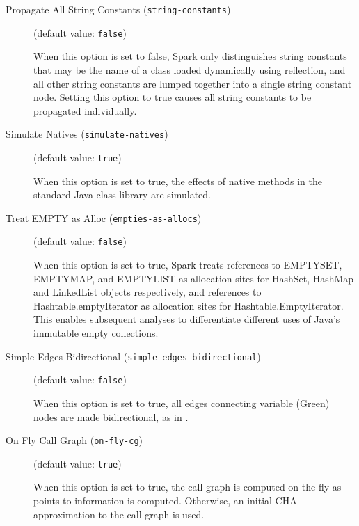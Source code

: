 \documentclass{article}
\begin{document}
\begin{description}
\item[Propagate All String Constants ({\tt string-constants})]
(default value: {\tt false})




When this option is set to false, Spark only distinguishes string constants that
may be the name of a class loaded dynamically using reflection, and all other
string constants are lumped together into a single string constant node.
Setting this option to true causes all string constants to be propagated
individually.
        


\item[Simulate Natives ({\tt simulate-natives})]
(default value: {\tt true})




When this option is set to true, the effects of native methods in the standard Java class library are simulated.
        


\item[Treat EMPTY as Alloc ({\tt empties-as-allocs})]
(default value: {\tt false})




When this option is set to true, Spark treats references to EMPTYSET, EMPTYMAP, and 
EMPTYLIST as allocation sites for HashSet, HashMap and LinkedList objects respectively, and references to Hashtable.emptyIterator as allocation sites for Hashtable.EmptyIterator. This enables subsequent analyses to differentiate different uses of Java's immutable empty collections.
        


\item[Simple Edges Bidirectional ({\tt simple-edges-bidirectional})]
(default value: {\tt false})




When this option is set to true, all edges connecting variable (Green)
nodes are made bidirectional, as in .
        


\item[On Fly Call Graph ({\tt on-fly-cg})]
(default value: {\tt true})




When this option is set to true, the call graph is computed on-the-fly
as points-to information is computed. Otherwise, an initial
CHA approximation to the call graph is used.
        


\end{description}
\end{document}
